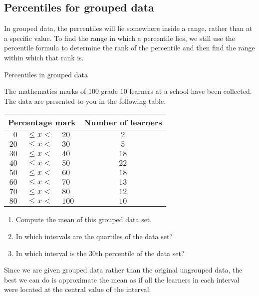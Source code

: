 \subsection{Percentiles for grouped data}

In grouped data, the percentiles will lie somewhere inside a range,
rather than at a specific value. To find the range in which a
percentile lies, we still use the percentile formula to determine the
rank of the percentile and then find the range within which that rank
is.

\begin{wex}{Percentiles in grouped data}{
    The mathematics marks of $100$ grade $10$ learners at a school have
    been collected. The data are presented to you in the following
    table.
    \begin{center}
      \begin{tabular}{r@{\ }c@{\ }lc}
        \toprule
        \multicolumn{3}{c}{Percentage mark} & Number of learners \\
        \midrule
         $0$ & $ \le x < $ &  $20$ &  $2$ \\
        $20$ & $ \le x < $ &  $30$ &  $5$ \\
        $30$ & $ \le x < $ &  $40$ & $18$ \\
        $40$ & $ \le x < $ &  $50$ & $22$ \\
        $50$ & $ \le x < $ &  $60$ & $18$ \\
        $60$ & $ \le x < $ &  $70$ & $13$ \\
        $70$ & $ \le x < $ &  $80$ & $12$ \\
        $80$ & $ \le x < $ & $100$ & $10$ \\
        \bottomrule
      \end{tabular}
    \end{center}

    \begin{enumerate}[noitemsep, label=\textbf{\arabic*}.]
    \item Compute the mean of this grouped data set.
    \item In which intervals are the quartiles of the data set?
    \item In which interval is the $30$th percentile of the data set?
    \end{enumerate}
}{


  Since we are given grouped data rather than the original ungrouped
  data, the best we can do is approximate the mean as if all the
  learners in each interval were located at the central value of the
  interval.

}
\end{wex}
